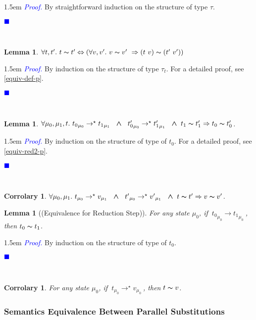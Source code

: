 \documentclass[a4paper,11pt,oneside]{article}
\theoremstyle{plain}
\newtheorem{lemma}[definition]{Lemma}
\newtheorem{corr}[definition]{Corrolary}
\renewenvironment{proof}{\noindent \begin{adjustwidth}{1.5em}{} \textcolor{blue}{\textit{Proof.}}}
{{\begin{tiny}\textcolor{blue}{$\blacksquare$}\end{tiny}}
\end{adjustwidth}~\\\noindent}
\newcommand{\tmapp}[2]{(#1 ~ #2)}
\newcommand{\ty}[1][]{\tau_{#1}}
\newcommand{\bwedge}{\boldsymbol{~\wedge~}}
\newcommand{\evalstep}[4]{~#1_{\mu_#2} \rightarrow #3_{\mu_#4} ~}
\newcommand{\evalstar}[4]{~#1_{\mu_#2} \rightarrow^{\star} #3_{\mu_#4} ~}
\newcommand{\eqv}[1]{#1 \thicksim #1'}
\begin{document}
	\begin{proof}
		By straightforward induction on the structure of type $\tau$.
	\end{proof}

	\begin{lemma}
		$\forall t,t'.~ \eqv{t} \Leftrightarrow 
			(\forall v, v'.~\eqv{v}~\Rightarrow
			\tmapp{t}{v} \thicksim \tmapp{t'}{v'})$
	\label{equiv-def-l}
	\end{lemma}
	
	\begin{proof} By induction on the structure of type $\ty[t]$.
	For a detailed proof, see \ref{equiv-def-p}.
	\end{proof}

	
	\begin{lemma} 
	$\forall \mu_0, \mu_1, t.\evalstar{{t_0}}{0}{{t_1}}{1} \bwedge \evalstar{{t_0'}}{0}{{t_1'}}{1} \bwedge \eqv{t_1} \Rightarrow \eqv{t_0}$.
		\label{equiv-red2-l}
	\end{lemma}
	
	\begin{proof}
		By induction on the structure of type of $t_0$. 
		For a detailed proof, see \ref{equiv-red2-p}.
	\end{proof}		
	\begin{corr} 
		$\forall \mu_0, \mu_1.\evalstar{{t}}{0}{{v}}{1} \bwedge \evalstar{{t'}}{0}{{v'}}{1} \bwedge \eqv{t} \Rightarrow \eqv{v}$.
		\label{equivalence parallel preservation corr}
	\end{corr}
	
	
	\begin{lemma}[(Equivalence for Reduction Step)]
		For any state $\mu_0$, if $\evalstep{{t_0}}{0}{{t_1}}{0}$, then
		$t_0 \thicksim t_1$.
	\end{lemma}	
	\begin{proof}
		By induction on the structure of type of $t_0$.
	\end{proof}		

	\begin{corr} 
		\label{equiv-red-corr}
		For any state $\mu_0$, if $\evalstar{{t}}{0}{{v}}{0}$, then		
		$t \thicksim v$.
	\end{corr}
\subsubsection*{Semantics Equivalence Between Parallel Substitutions}
\end{document}

